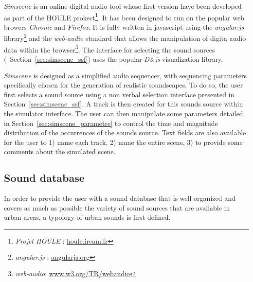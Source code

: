\documentclass[twoside,twocolumn]{article}
\begin{document}
\emph{Simscene} is an online digital audio tool whose first version have been developed as part of the HOULE prokect\footnote{\emph{Projet HOULE} : \url{houle.ircam.fr}}. It has been designed to run on the popular web browers \emph{Chrome} and \emph{Firefox}. It is fully written in javascript using the \emph{angular.js} library\footnote{\emph{angular.js} : \url{angularjs.org}} and the \emph{web-audio} standard that allows the manipulation of digita audio data within the browser\footnote{\emph{web-audio}: \url{www.w3.org/TR/webaudio}}. The interface for selecting the sound sources (\cf~Section~\ref{sec:simscene_ssf}) uses the popular \emph{D3.js} \cite{d32011} visualization library.


\emph{Simscene} is designed as a simplified audio sequencer, with sequencing parameters specifically chosen for the generation of realistic soundscapes. To do so, the user first selects a sound source using a non verbal selection interface presented in Section~\ref{sec:simscene_ssf}. A track is then created for this sounds source within the simulator interface. The user can then manipulate some parameters detailed in Section~\ref{sec:simscene_parametre} to control the time and magnitude distribution of the occurrences of the sounds source. Text fields are also available for the user to 1) name each track, 2) name the entire scene, 3) to provide some comments about the simulated scene.

\subsection{Sound database}
\label{sec:simscene_sampleDataSet}

In order to provide the user with a sound database that is well organized and covers as much as possible the variety of sound sources that are available in urban areas, a typology of urban sounds is first defined.
\end{document}
